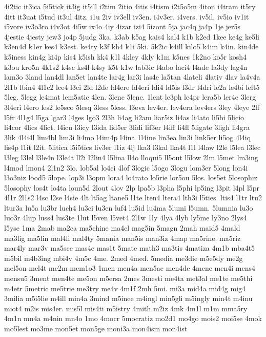 {4i2tic
it3ica
5i5tick
it3ig
it5ill
i2tim
2itio
4itis
i4tism
i2t5o5m
4iton
i4tram
it5ry
4itt
it3uat
i5tud
it3ul
4itz.
i1u
2iv
iv3ell
iv3en.
i4v3er.
i4vers.
iv5il.
iv5io
iv1it
i5vore
iv3o3ro
i4v3ot
4i5w
ix4o
4iy
4izar
izi4
5izont
5ja
jac4q
ja4p
1je
jer5s
4jestie
4jesty
jew3
jo4p
5judg
3ka.
k3ab
k5ag
kais4
kal4
k1b
k2ed
1kee
ke4g
ke5li
k3en4d
k1er
kes4
k3est.
ke4ty
k3f
kh4
k1i
5ki.
5k2ic
k4ill
kilo5
k4im
k4in.
kin4de
k5iness
kin4g
ki4p
kis4
k5ish
kk4
k1l
4kley
4kly
k1m
k5nes
1k2no
ko5r
kosh4
k3ou
kro5n
4k1s2
k4sc
ks4l
k4sy
k5t
k1w
lab3ic
l4abo
laci4
l4ade
la3dy
lag4n
lam3o
3land
lan4dl
lan5et
lan4te
lar4g
lar3i
las4e
la5tan
4lateli
4lativ
4lav
la4v4a
2l1b
lbin4
4l1c2
lce4
l3ci
2ld
l2de
ld4ere
ld4eri
ldi4
ld5is
l3dr
l4dri
le2a
le4bi
left5
5leg.
5legg
le4mat
lem5atic
4len.
3lenc
5lene.
1lent
le3ph
le4pr
lera5b
ler4e
3lerg
3l4eri
l4ero
les2
le5sco
5lesq
3less
5less.
l3eva
lev4er.
lev4era
lev4ers
3ley
4leye
2lf
l5fr
4l1g4
l5ga
lgar3
l4ges
lgo3
2l3h
li4ag
li2am
liar5iz
li4as
li4ato
li5bi
5licio
li4cor
4lics
4lict.
l4icu
l3icy
l3ida
lid5er
3lidi
lif3er
l4iff
li4fl
5ligate
3ligh
li4gra
3lik
4l4i4l
lim4bl
lim3i
li4mo
l4im4p
l4ina
1l4ine
lin3ea
lin3i
link5er
li5og
4l4iq
lis4p
l1it
l2it.
5litica
l5i5tics
liv3er
l1iz
4lj
lka3
l3kal
lka4t
l1l
l4law
l2le
l5lea
l3lec
l3leg
l3lel
l3le4n
l3le4t
ll2i
l2lin4
l5lina
ll4o
lloqui5
ll5out
l5low
2lm
l5met
lm3ing
l4mod
lmon4
2l1n2
3lo.
lob5al
lo4ci
4lof
3logic
l5ogo
3logu
lom3er
5long
lon4i
l3o3niz
lood5
5lope.
lop3i
l3opm
lora4
lo4rato
lo5rie
lor5ou
5los.
los5et
5losophiz
5losophy
los4t
lo4ta
loun5d
2lout
4lov
2lp
lpa5b
l3pha
l5phi
lp5ing
l3pit
l4pl
l5pr
4l1r
2l1s2
l4sc
l2se
l4sie
4lt
lt5ag
ltane5
l1te
lten4
ltera4
lth3i
l5ties.
ltis4
l1tr
ltu2
ltur3a
lu5a
lu3br
luch4
lu3ci
lu3en
luf4
lu5id
lu4ma
5lumi
l5umn.
5lumnia
lu3o
luo3r
4lup
luss4
lus3te
1lut
l5ven
l5vet4
2l1w
1ly
4lya
4lyb
ly5me
ly3no
2lys4
l5yse
1ma
2mab
ma2ca
ma5chine
ma4cl
mag5in
5magn
2mah
maid5
4mald
ma3lig
ma5lin
mal4li
mal4ty
5mania
man5is
man3iz
4map
ma5rine.
ma5riz
mar4ly
mar3v
ma5sce
mas4e
mas1t
5mate
math3
ma3tis
4matiza
4m1b
mba4t5
m5bil
m4b3ing
mbi4v
4m5c
4me.
2med
4med.
5media
me3die
m5e5dy
me2g
mel5on
mel4t
me2m
mem1o3
1men
men4a
men5ac
men4de
4mene
men4i
mens4
mensu5
3ment
men4te
me5on
m5ersa
2mes
3mesti
me4ta
met3al
me1te
me5thi
m4etr
5metric
me5trie
me3try
me4v
4m1f
2mh
5mi.
mi3a
mid4a
mid4g
mig4
3milia
m5i5lie
m4ill
min4a
3mind
m5inee
m4ingl
min5gli
m5ingly
min4t
m4inu
miot4
m2is
mis4er.
mis5l
mis4ti
m5istry
4mith
m2iz
4mk
4m1l
m1m
mma5ry
4m1n
mn4a
m4nin
mn4o
1mo
4mocr
5mocratiz
mo2d1
mo4go
mois2
moi5se
4mok
mo5lest
mo3me
mon5et
mon5ge
moni3a
mon4ism
mon4ist
}
